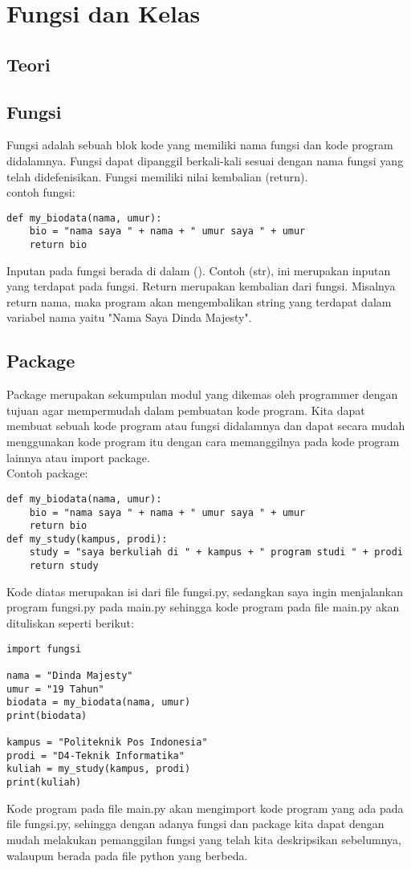 \chapter{Fungsi dan Kelas}

\section{Teori}
\section{Fungsi}
Fungsi adalah sebuah blok kode yang memiliki nama fungsi dan kode program didalamnya. Fungsi dapat dipanggil berkali-kali sesuai dengan nama fungsi yang telah didefenisikan. Fungsi memiliki nilai kembalian (return).\\
contoh fungsi:
\begin{verbatim}
def my_biodata(nama, umur):
    bio = "nama saya " + nama + " umur saya " + umur
    return bio
\end{verbatim}
Inputan pada fungsi berada di dalam (). Contoh (str), ini merupakan inputan yang terdapat pada fungsi. Return merupakan kembalian dari fungsi. Misalnya return nama, maka program akan mengembalikan string yang terdapat dalam variabel nama yaitu "Nama Saya Dinda Majesty".

\section{Package}
Package merupakan sekumpulan modul yang dikemas oleh programmer dengan tujuan agar mempermudah dalam pembuatan kode program. Kita dapat membuat sebuah kode program atau fungsi didalamnya dan dapat secara mudah menggunakan kode program itu dengan cara memanggilnya pada kode program lainnya atau import package.\\
Contoh package:
\begin{verbatim}
def my_biodata(nama, umur):
    bio = "nama saya " + nama + " umur saya " + umur
    return bio
def my_study(kampus, prodi):
	study = "saya berkuliah di " + kampus + " program studi " + prodi
	return study
\end{verbatim}
Kode diatas merupakan isi dari file fungsi.py, sedangkan saya ingin menjalankan program fungsi.py pada main.py sehingga kode program pada file main.py akan dituliskan seperti berikut:
\begin{verbatim}
import fungsi

nama = "Dinda Majesty"
umur = "19 Tahun"
biodata = my_biodata(nama, umur)
print(biodata)

kampus = "Politeknik Pos Indonesia"
prodi = "D4-Teknik Informatika"
kuliah = my_study(kampus, prodi)
print(kuliah)
\end{verbatim}
Kode program pada file main.py akan mengimport kode program yang ada pada file fungsi.py, sehingga dengan adanya fungsi dan package kita dapat dengan mudah melakukan pemanggilan fungsi yang telah kita deskripsikan sebelumnya, walaupun berada pada file python yang berbeda.

